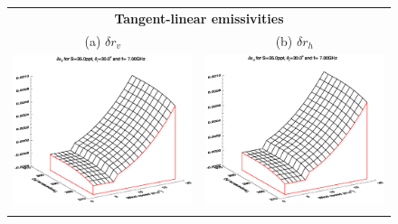 \begin{figure}[htp]
  \centering
  \begin{tabular}{c c}
    \multicolumn{2}{c}{\sffamily\textbf{Tangent-linear emissivities}}\\
    \textsf{(a)} $\delta r_v$ &
    \textsf{(b)} $\delta r_h$ \\
    \includegraphics[bb=120 240 508 540,clip,scale=0.5]{graphics/Model/TLAD/ev_TL_s35.0ppt_z30.0_7.00GHz.eps} &
    \includegraphics[bb=120 240 508 540,clip,scale=0.5]{graphics/Model/TLAD/eh_TL_s35.0ppt_z30.0_7.00GHz.eps} \\\\

\end{tabular}
\end{figure}
